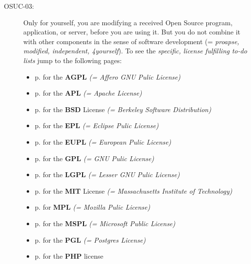 \begin{description}
\item[OSUC-03:]\label{OSUC-03-DEF} Only for yourself, you are modifying a
received Open Source program, application, or server, before you are using it.
But you do not combine it with other components in the sense of software
development (= \textit{proapse, modified, independent, 4yourself}).
To see the \textit{specific, license fulfilling to-do lists} jump to the
following pages:
   \begin{itemize}
    \item p. \pageref{OSUC-03-AGPL} for the \textbf{AGPL}
      \textit{(= Affero GNU Pulic License)} 
    \item p. \pageref{OSUC-03-Apache20} for the \textbf{APL}
      \textit{(= Apache License)}
    \item p. \pageref{OSUC-03-BSD} for the \textbf{BSD} License
      \textit{(= Berkeley Software Distribution)}
    \item p. \pageref{OSUC-03-EPL} for the \textbf{EPL}
      \textit{(= Eclipse Pulic License)}     
    \item p. \pageref{OSUC-03-EUPL} for the \textbf{EUPL}
      \textit{(= European Pulic License)} 
    \item p. \pageref{OSUC-03-GPL} for the \textbf{GPL}
       \textit{(= GNU Pulic License)} 
    \item p. \pageref{OSUC-03-LGPL} for the \textbf{LGPL}
      \textit{(= Lesser GNU Pulic License)}           
    \item p. \pageref{OSUC-03-MIT} for the \textbf{MIT} License
       \textit{(= Massachusetts Institute of Technology)} 
    \item p. \pageref{OSUC-03-MPL} for \textbf{MPL}
      \textit{(= Mozilla Pulic License)}     
    \item p. \pageref{OSUC-03-MsPL} for the \textbf{MSPL}
      \textit{(= Microsoft Public License)} 
    \item p. \pageref{OSUC-03-PGL} for the \textbf{PGL}
      \textit{(= Postgres License)} 
    \item p. \pageref{OSUC-03-PHP} for the \textbf{PHP} license 
  \end{itemize}


\end{description}
